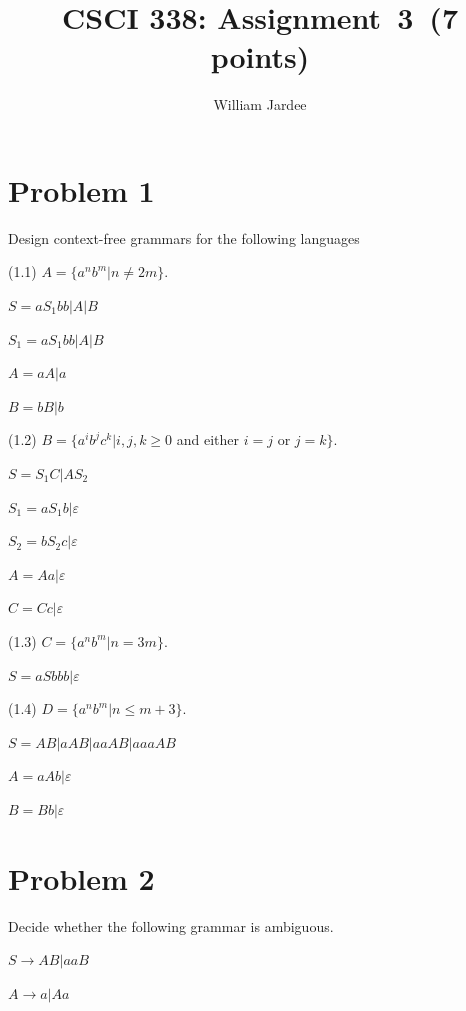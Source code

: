 \documentclass[11pt]{article}
\title{CSCI 338: Assignment~3~(7 points)}
\author{William Jardee}
\date{}
\begin{document}
\maketitle

\section*{Problem 1}

\noindent
Design context-free grammars for the following languages

(1.1) $A=\{a^nb^m|n\neq 2m\}$.

    \quad $S=aS_1bb | A | B$
    
    \quad $S_1 = aS_1 bb | A | B$
    
    \quad $A = aA|a$
    
    \quad $B=bB|b$
\newline


(1.2) $B=\{a^ib^jc^k|i,j,k\geq 0$ and either $i=j$ or $j=k\}$.

    \quad $S = S_1C|AS_2$
    
    \quad $S_1 = aS_1b | \varepsilon$
    
    \quad $S_2 = bS_2c | \varepsilon$
    
    \quad $A = Aa| \varepsilon$
        
    \quad $C = Cc| \varepsilon$
\newline


(1.3) $C=\{a^nb^m|n=3m\}$.

    \quad $S = aSbbb | \varepsilon$
\newline

(1.4) $D=\{a^nb^m|n\leq m+3\}$.

    \quad $S = AB|aAB|aaAB|aaaAB$
    
    \quad $A = aAb|\varepsilon$
    
    \quad $B= Bb | \varepsilon$
    
    
    
\newpage




\section*{Problem 2}

\noindent
Decide whether the following grammar is ambiguous.
\newline

$S\rightarrow AB|aaB$

$A\rightarrow a|Aa$
\end{document}
